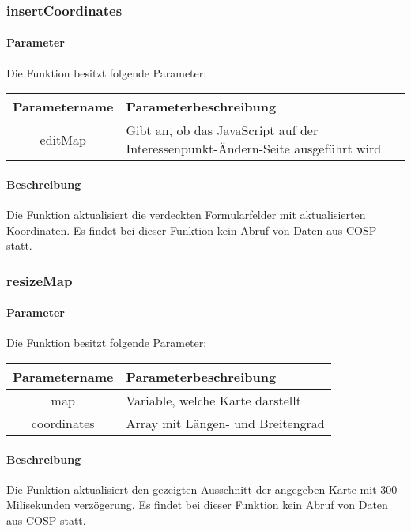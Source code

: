 \subsubsection{insertCoordinates}
\paragraph{Parameter} Die Funktion besitzt folgende Parameter:
\begin{table}[H]
	\begin{tabular}{|c|p{11cm}|}
		\hline
		\textbf{Parametername} & \textbf{Parameterbeschreibung} \\ \hline
		editMap     & Gibt an, ob das JavaScript auf der Interessenpunkt-Ändern-Seite ausgeführt wird \\ \hline
	\end{tabular}
\end{table}
\paragraph{Beschreibung} Die Funktion aktualisiert die verdeckten Formularfelder mit aktualisierten Koordinaten. Es findet bei dieser Funktion kein Abruf von Daten aus {\glqq COSP\grqq} statt.
\subsubsection{resizeMap}
\paragraph{Parameter} Die Funktion besitzt folgende Parameter:
\begin{table}[H]
	\begin{tabular}{|c|p{11cm}|}
		\hline
		\textbf{Parametername} & \textbf{Parameterbeschreibung} \\ \hline
		map         & Variable, welche Karte darstellt \\ \hline
		coordinates & Array mit Längen- und Breitengrad \\ \hline
	\end{tabular}
\end{table}
\paragraph{Beschreibung} Die Funktion aktualisiert den gezeigten Ausschnitt der angegeben Karte mit 300 Milisekunden verzögerung. Es findet bei dieser Funktion kein Abruf von Daten aus {\glqq COSP\grqq} statt.